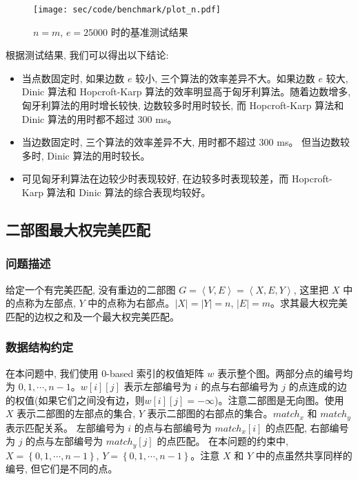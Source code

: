\begin{figure}[H]
	\centering
	\texttt{[image: sec/code/benchmark/plot\_n.pdf]}
	\caption{$n = m$, $e = 25000$ 时的基准测试结果}
	\label{fig:benchmark_n_plot}
\end{figure}

根据测试结果, 我们可以得出以下结论: 
\begin{itemize}
	\item 当点数固定时, 如果边数 $e$ 较小, 三个算法的效率差异不大。如果边数 $e$ 较大, Dinic 算法和 Hopcroft-Karp 算法的效率明显高于匈牙利算法。随着边数增多, 匈牙利算法的用时增长较快, 边数较多时用时较长, 而 Hopcroft-Karp 算法和 Dinic 算法的用时都不超过 300 ms。
	\item 当边数固定时, 三个算法的效率差异不大, 用时都不超过 300 ms。 但当边数较多时, Dinic 算法的用时较长。
	\item 可见匈牙利算法在边较少时表现较好, 在边较多时表现较差，而 Hopcroft-Karp 算法和 Dinic 算法的综合表现均较好。
\end{itemize}

\subsection{二部图最大权完美匹配}
\subsubsection{问题描述}
给定一个有完美匹配, 没有重边的二部图 $G = \left<V, E\right> = \left<X, E, Y\right>$, 这里把 $X$ 中的点称为左部点, $Y$ 中的点称为右部点。$\left|X\right| = \left|Y\right| = n$, $\left|E\right| = m$。求其最大权完美匹配的边权之和及一个最大权完美匹配。
\subsubsection{数据结构约定}
在本问题中, 我们使用 0-based 索引的权值矩阵 $w$ 表示整个图。两部分点的编号均为 $0, 1, \cdots, n - 1$。$w[i][j]$ 表示左部编号为 $i$ 的点与右部编号为 $j$ 的点连成的边的权值(如果它们之间没有边，则$w[i][j] = -\infty$)。注意二部图是无向图。使用 $X$ 表示二部图的左部点的集合, $Y$ 表示二部图的右部点的集合。$match_x$ 和 $match_y$ 表示匹配关系。
左部编号为 $i$ 的点与右部编号为 $match_x[i]$ 的点匹配, 右部编号为 $j$ 的点与左部编号为 $match_y[j]$ 的点匹配。
在本问题的约束中, $X = \left\{0, 1, \cdots, n - 1\right\}$, $Y = \left\{0, 1, \cdots, n - 1\right\}$。注意 $X$ 和 $Y$ 中的点虽然共享同样的编号, 但它们是不同的点。

